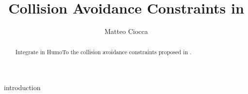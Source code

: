 \documentclass[a4paper, 10pt, conference]{ieeeconf}      %
\title{\LARGE \bf
Collision Avoidance Constraints in \sn{HuMoTo}
}
\author{Matteo Ciocca}
\newcommand{\sn}[1]{{\ttfamily #1}}
\begin{document}
\maketitle
\thispagestyle{empty}
\pagestyle{empty}
\begin{abstract}
Integrate in \sn{HumoTo} the collision avoidance constraints proposed in \cite{bohorquez2016navig,AlHomsi2016}.

\end{abstract}

{introduction}








\end{document}
